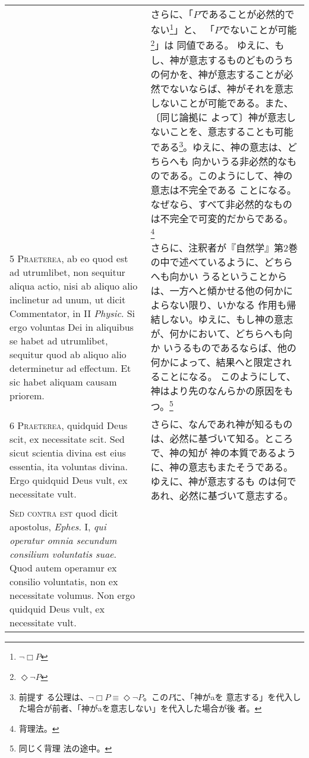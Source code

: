 \documentclass[10pt]{jsarticle} %
\begin{document}
\begin{longtable}{p{21em}p{21em}}
&
さらに、「$P$であることが必然的でない\footnote{$\lnot \Box P$}」と、
 「$P$でないことが可能\footnote{$\Diamond \lnot P$}」は
 同値である。
 ゆえに、もし、神が意志するものどものうちの何かを、神が意志することが必
 然でないならば、神がそれを意志しないことが可能である。また、〔同じ論拠に
 よって〕神が意志しないことを、意志することも可能である\footnote{前提す
 る公理は、$\lnot \Box P \equiv \Diamond \lnot P$。この$P$に、「神がaを
 意志する」を代入した場合が前者、「神がaを意志しない」を代入した場合が後
 者。}。ゆえに、神の意志は、どちらへも
 向かいうる非必然的なものである。このようにして、神の意志は不完全である
 ことになる。なぜなら、すべて非必然的なものは不完全で可変的だからである。
 \footnote{背理法。}

 
\\


{\scshape 5 Praeterea}, ab eo quod est ad utrumlibet,
non sequitur aliqua actio, nisi ab aliquo alio inclinetur ad unum, ut
dicit Commentator, in II {\itshape Physic}. Si ergo voluntas Dei in aliquibus se
habet ad utrumlibet, sequitur quod ab aliquo alio determinetur ad
effectum. Et sic habet aliquam causam priorem.


&

 さらに、注釈者が『自然学』第2巻の中で述べているように、どちらへも向かい
 うるということからは、一方へと傾かせる他の何かによらない限り、いかなる
 作用も帰結しない。ゆえに、もし神の意志が、何かにおいて、どちらへも向か
 いうるものであるならば、他の何かによって、結果へと限定されることになる。
 このようにして、神はより先のなんらかの原因をもつ。\footnote{同じく背理
 法の途中。}

\\



{\scshape 6 Praeterea}, quidquid Deus scit, ex
necessitate scit. Sed sicut scientia divina est eius essentia, ita
voluntas divina. Ergo quidquid Deus vult, ex necessitate vult.


&

さらに、なんであれ神が知るものは、必然に基づいて知る。ところで、神の知が
 神の本質であるように、神の意志もまたそうである。ゆえに、神が意志するも
 のは何であれ、必然に基づいて意志する。

 
\\


{\scshape  Sed contra est} quod dicit apostolus,
{\itshape Ephes}. I, {\itshape qui operatur omnia secundum consilium voluntatis suae}. Quod
autem operamur ex consilio voluntatis, non ex necessitate volumus. Non
ergo quidquid Deus vult, ex necessitate vult.



\end{longtable}
\end{document}
